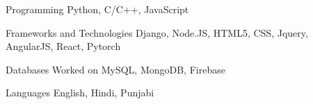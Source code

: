 


\begin{cvskills}


\cvskill
{Programming} %
{Python, C/C++, JavaScript} %


\cvskill
{Frameworks and Technologies} %
{Django, Node.JS, HTML5, CSS, Jquery, AngularJS, React, Pytorch} %


\cvskill
{Databases} %
{Worked on MySQL, MongoDB, Firebase} %


\cvskill
{Languages} %
{English, Hindi, Punjabi} %


\end{cvskills}